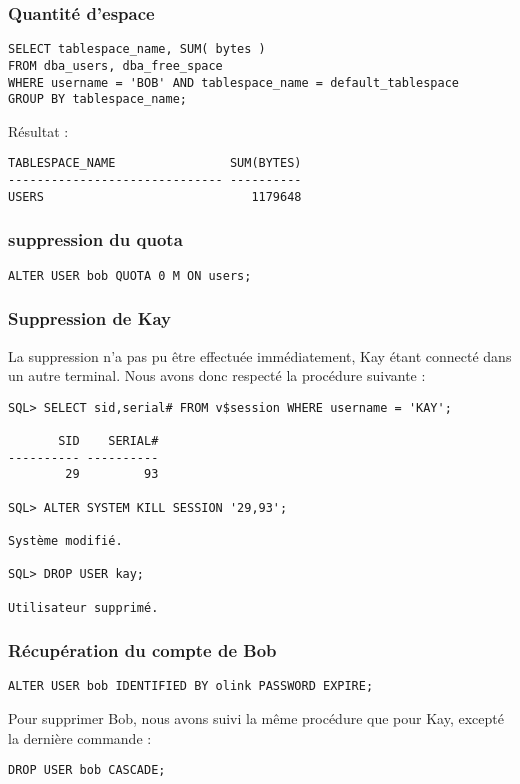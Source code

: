 \subsubsection{Quantité d’espace}

\begin{verbatim}
SELECT tablespace_name, SUM( bytes )
FROM dba_users, dba_free_space
WHERE username = 'BOB' AND tablespace_name = default_tablespace
GROUP BY tablespace_name;
\end{verbatim}

Résultat :
\begin{verbatim}
TABLESPACE_NAME                SUM(BYTES)                                       
------------------------------ ----------                                       
USERS                             1179648 
\end{verbatim}

\subsubsection{suppression du quota}

\begin{verbatim}
ALTER USER bob QUOTA 0 M ON users;
\end{verbatim}

\subsubsection{Suppression de Kay}

La suppression n’a pas pu être effectuée immédiatement, Kay étant connecté
dans un autre terminal. Nous avons donc respecté la procédure suivante :

\begin{verbatim}
SQL> SELECT sid,serial# FROM v$session WHERE username = 'KAY';

       SID    SERIAL#                                                           
---------- ----------                                                           
        29         93   

SQL> ALTER SYSTEM KILL SESSION '29,93';

Système modifié.

SQL> DROP USER kay;

Utilisateur supprimé.                                                        
\end{verbatim}

\subsubsection{Récupération du compte de Bob}

\begin{verbatim}
ALTER USER bob IDENTIFIED BY olink PASSWORD EXPIRE;
\end{verbatim}

Pour supprimer Bob, nous avons suivi la même procédure que pour Kay, excepté la dernière commande :
\begin{verbatim}
DROP USER bob CASCADE;
\end{verbatim}
